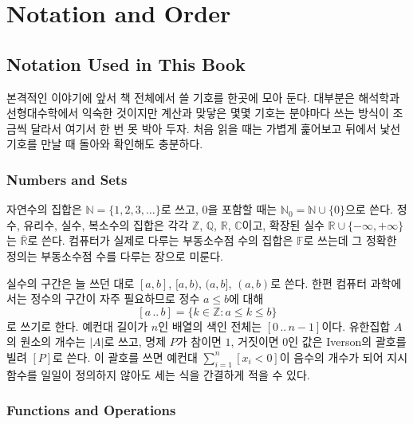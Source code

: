 \chapter{Notation and Order}
\label{ch:order}



\section{Notation Used in This Book}
\label{sec:notation}

본격적인 이야기에 앞서 책 전체에서 쓸 기호를 한곳에 모아 둔다. 대부분은 해석학과 선형대수학에서 익숙한 것이지만 계산과 맞닿은 몇몇 기호는 분야마다 쓰는 방식이 조금씩 달라서 여기서 한 번 못 박아 두자. 처음 읽을 때는 가볍게 훑어보고 뒤에서 낯선 기호를 만날 때 돌아와 확인해도 충분하다.

\subsection{Numbers and Sets}

자연수의 집합은 $\mathbb{N}=\{1,2,3,\dots\}$로 쓰고, $0$을 포함할 때는 $\mathbb{N}_0=\mathbb{N}\cup\{0\}$으로 쓴다. 정수, 유리수, 실수, 복소수의 집합은 각각 $\mathbb{Z}$, $\mathbb{Q}$, $\mathbb{R}$, $\mathbb{C}$이고, 확장된 실수 $\mathbb{R}\cup\{-\infty,+\infty\}$는 $\overline{\mathbb{R}}$로 쓴다. 컴퓨터가 실제로 다루는 부동소수점 수의 집합은 $\mathbb{F}$로 쓰는데 그 정확한 정의는 부동소수점 수를 다루는 장으로 미룬다.

실수의 구간은 늘 쓰던 대로 $[a,b]$, $[a,b)$, $(a,b]$, $(a,b)$로 쓴다. 한편 컴퓨터 과학에서는 정수의 구간이 자주 필요하므로 정수 $a\le b$에 대해
\[
[a\,..\,b]=\{k\in\mathbb{Z}: a\le k\le b\}
\]
로 쓰기로 한다. 예컨대 길이가 $n$인 배열의 색인 전체는 $[0\,..\,n-1]$이다. 유한집합 $A$의 원소의 개수는 $|A|$로 쓰고, 명제 $P$가 참이면 $1$, 거짓이면 $0$인 값은 Iverson의 괄호를 빌려 $[P]$로 쓴다. 이 괄호를 쓰면 예컨대 $\sum_{i=1}^{n}[x_i<0]$이 음수의 개수가 되어 지시함수를 일일이 정의하지 않아도 세는 식을 간결하게 적을 수 있다.

\subsection{Functions and Operations}

